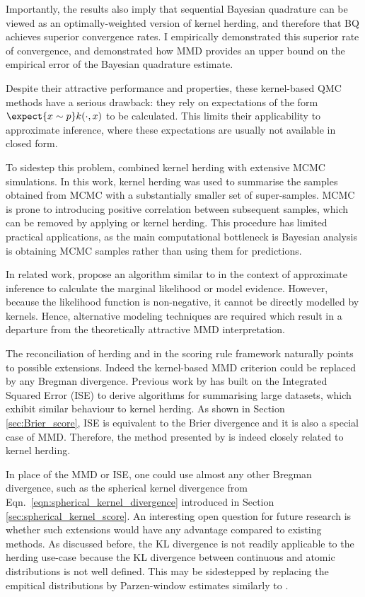Importantly, the results also imply that sequential Bayesian quadrature can be viewed as an optimally-weighted version of kernel herding, and therefore that BQ achieves superior convergence rates. I empirically demonstrated this superior rate of convergence, and demonstrated how MMD provides an upper bound on the empirical error of the Bayesian quadrature estimate.

Despite their attractive performance and properties, these kernel-based QMC methods have a serious drawback: they rely on expectations of the form $\expect{x\sim p} k(\cdot,x)$ to be calculated. This limits their applicability to approximate inference, where these expectations are usually not available in closed form.

To sidestep this problem, \citet{Chen2010} combined kernel herding with extensive MCMC simulations. In this work, kernel herding was used to summarise the samples obtained from MCMC with a substantially smaller set of super-samples. MCMC is prone to introducing positive correlation between subsequent samples, which can be removed by applying \sbq{} or kernel herding. This procedure has limited practical applications, as the main computational bottleneck is Bayesian analysis is obtaining MCMC samples rather than using them for predictions.

In related work, \citet{Osborne2012} propose an algorithm similar to \sbq{} in the context of approximate inference to calculate the marginal likelihood or model evidence. However, because the likelihood function is non-negative, it cannot be directly modelled by kernels. Hence, alternative modeling techniques are required which result in a departure from the theoretically attractive MMD interpretation.

\cbstart
The reconciliation of herding and \bq{} in the scoring rule framework naturally points to possible extensions. Indeed the kernel-based MMD criterion could be replaced by any Bregman divergence. Previous work by \citet{Girolami03} has built on the Integrated Squared Error (ISE) to derive algorithms for summarising large datasets, which exhibit similar behaviour to kernel herding. As shown in Section \ref{sec:Brier_score}, ISE is equivalent to the Brier divergence and it is also a special case of MMD. Therefore, the method presented by \citet{Girolami03} is indeed closely related to kernel herding.

In place of the MMD or ISE, one could use almost any other Bregman divergence, such as the spherical kernel divergence from Eqn.\ \ref{eqn:spherical_kernel_divergence} introduced in Section \ref{sec:spherical_kernel_score}. An interesting open question for future research is whether such extensions would have any advantage compared to existing methods. As discussed before, the KL divergence is not readily applicable to the herding use-case because the KL divergence between continuous and atomic distributions is not well defined. This may be sidestepped by replacing the empitical distributions by Parzen-window estimates similarly to \citep{Girolami03}.
\cbend

